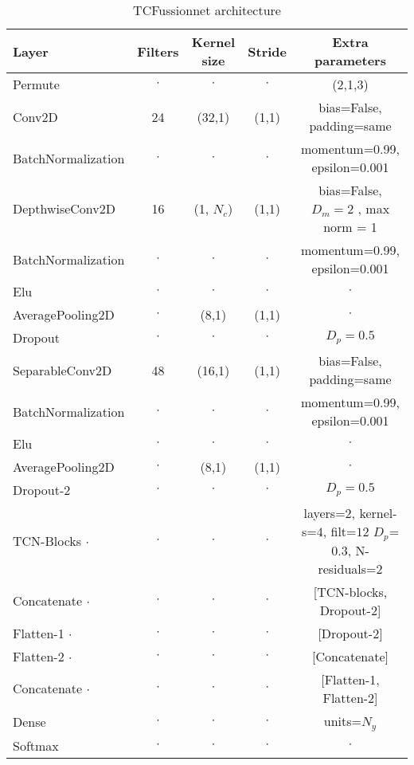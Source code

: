 \begin{table}[h!]
\caption{TCFussionnet architecture}\label{table:tcfnet}
\centering
\begin{tabular}{l|c|c|c|c}
\hline
\textbf{Layer} & \textbf{Filters} & \textbf{Kernel size} & \textbf{Stride} & \textbf{Extra parameters}\\
\hline
Permute & $\cdot$ & $\cdot$ & $\cdot$ & (2,1,3)\\
Conv2D & 24 & (32,1) & (1,1) & bias=False, padding=same \\
BatchNormalization & $\cdot$ & $\cdot$ & $\cdot$ & momentum=0.99, epsilon=0.001\\ 
\hline
DepthwiseConv2D & 16 & (1, $N_c$) & (1,1) & bias=False, $D_m= 2$ , max norm = 1  \\ 
BatchNormalization & $\cdot$ & $\cdot$ & $\cdot$ & momentum=0.99, epsilon=0.001\\ 
Elu & $\cdot$ & $\cdot$ & $\cdot$ & $\cdot$\\ 
AveragePooling2D & $\cdot$ & (8,1) & (1,1) & $\cdot$ \\ 
Dropout & $\cdot$ & $\cdot$ & $\cdot$ & $D_p = 0.5$\\
\hline
SeparableConv2D & 48 & (16,1) & (1,1) & bias=False, padding=same\\
BatchNormalization & $\cdot$ & $\cdot$ & $\cdot$ & momentum=0.99, epsilon=0.001\\
Elu & $\cdot$ & $\cdot$ & $\cdot$& $\cdot$\\
AveragePooling2D & $\cdot$ &(8,1) & (1,1)& $\cdot$\\
Dropout-2 & $\cdot$ & $\cdot$ & $\cdot$ & $D_p = 0.5$\\
\hline
TCN-Blocks $\cdot$ & $\cdot$ & $\cdot$ & $\cdot$ & layers=$2$, kernel-s=$4$, filt=$12$ $D_p$=$0.3$, N-residuals=2 \\
Concatenate $\cdot$ & $\cdot$ & $\cdot$ & $\cdot$ & [TCN-blocks, Dropout-2] \\
\hline
Flatten-1 $\cdot$ & $\cdot$ & $\cdot$ & $\cdot$ & [Dropout-2] \\
Flatten-2 $\cdot$ & $\cdot$ & $\cdot$ & $\cdot$ &  [Concatenate] \\
Concatenate $\cdot$ & $\cdot$ & $\cdot$ & $\cdot$ & [Flatten-1, Flatten-2] \\
\hline
Dense & $\cdot$ & $\cdot$ & $\cdot$ & units=$N_y$\\
Softmax & $\cdot$ & $\cdot$ & $\cdot$ & $\cdot$\\
\hline
\end{tabular}
\end{table}

